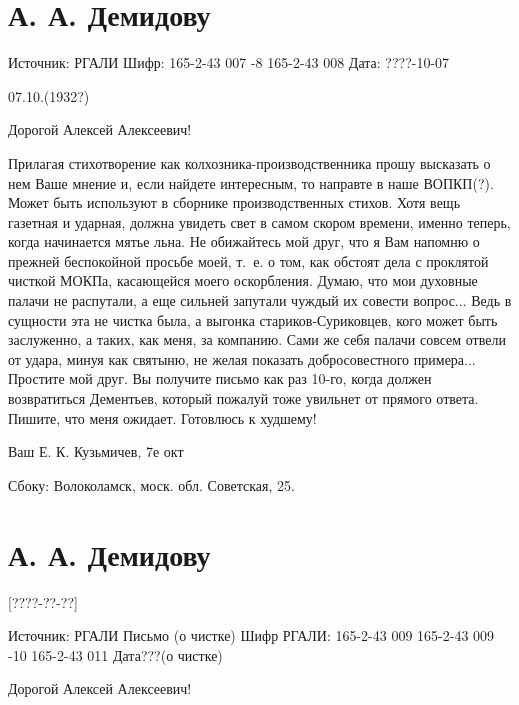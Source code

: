 \documentclass[]{memoir}
\begin{document}
\section{А. А. Демидову}

Источник: РГАЛИ
Шифр:   165-2-43 007 -8
        165-2-43 008
Дата: ????-10-07
                                                                       
07.10.(1932?)


                                                Дорогой 
                                      Алексей Алексеевич!

  Прилагая стихотворение как колхозника-производственника прошу высказать о нем Ваше мнение и, если найдете интересным, то направте в наше ВОПКП(?). Может быть используют в сборнике производственных стихов. Хотя вещь газетная и ударная, должна увидеть свет в самом скором времени, именно теперь, когда начинается мятье льна.
Не обижайтесь мой друг, что я Вам напомню о прежней беспокойной просьбе моей, т. е. о том, как обстоят дела с проклятой чисткой МОКПа, касающейся моего оскорбления.
Думаю, что мои духовные палачи не распутали, а еще сильней запутали чуждый их совести вопрос... Ведь в сущности эта не чистка была, а выгонка стариков-Суриковцев, кого может быть заслуженно, а таких, как меня, за компанию. Сами же себя палачи совсем отвели от удара, минуя как святыню, не желая показать добросовестного примера...
Простите мой друг. Вы получите письмо как раз 10-го, когда должен возвратиться Дементьев, который пожалуй тоже увильнет от прямого ответа. Пишите, что меня ожидает. Готовлюсь к худшему!

Ваш Е. К. Кузьмичев, 7е окт

Сбоку: Волоколамск, моск. обл. Советская, 25.


\section{А. А. Демидову}

[????-??-??]

Источник: РГАЛИ
Письмо (о чистке)
Шифр РГАЛИ:     165-2-43 009
                165-2-43 009 -10
                165-2-43 011
                                                                                                                Дата???(о чистке)

                                                              Дорогой
                                            Алексей Алексеевич!
\end{document}

